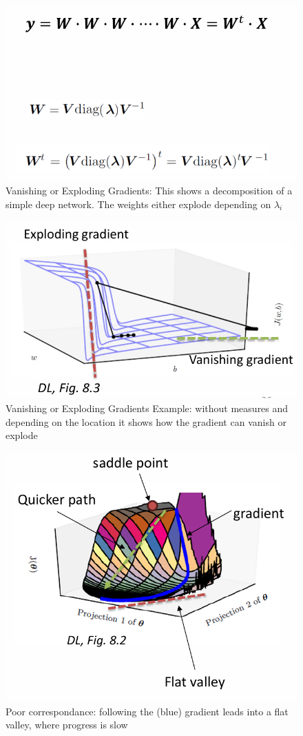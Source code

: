 \documentclass[../Main.tex]{subfiles}
\begin{document}
\begin{figure}[H]
    \centering
    \includegraphics[width=0.5\linewidth]{Images/deepl/expl-van-gradient.png}
    \caption{Vanishing or Exploding Gradients: This shows a decomposition of
    a simple deep network. The weights either explode depending on \(\lambda_i\)}
\end{figure}
\begin{figure}[H]
    \centering
    \includegraphics[width=0.5\linewidth]{Images/deepl/expl-van-gradient-example.png}
    \caption{Vanishing or Exploding Gradients Example: without measures and depending on the
    location it shows how the gradient can vanish or explode}
\end{figure}

\begin{figure}[H]
    \centering
    \includegraphics[width=0.5\linewidth]{Images/deepl/poor-correspondance.png}
    \caption{Poor correspondance:  following the (blue) gradient leads into a flat 
    valley, where progress is slow}
\end{figure}
\end{document}

